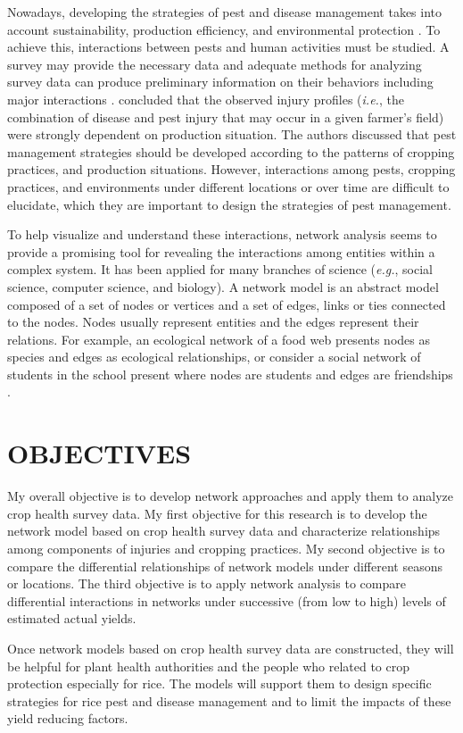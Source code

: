 Nowadays, developing the strategies of pest and disease management takes into account sustainability, production efficiency, and environmental protection \citep{Mew:2004kh}. To achieve this, interactions between pests and human activities must be studied. A survey may provide the necessary data and adequate methods for analyzing survey data can produce preliminary information on their behaviors including major interactions \citep{savary1995use}. \citet{Savary:2000vr} concluded that the observed injury profiles (\textit{i.e.}, the combination of disease and pest injury that may occur in a given farmer's field) were strongly dependent on production situation.  The authors discussed that pest management strategies should be developed according to the patterns of cropping practices, and production situations. However, interactions among pests, cropping practices, and environments under different locations or over time are difficult to elucidate, which they are important to design the strategies of pest management.

To help visualize and understand these interactions, network analysis seems to provide a promising tool for revealing the interactions among entities within a complex system. It has been applied for many branches of science (\textit{e.g.}, social science, computer science, and biology). A network model is an abstract model composed of a set of nodes or vertices and a set of edges, links or ties connected to the nodes. Nodes usually represent entities and the edges represent their relations. For example, an ecological network of a food web presents nodes as species \citep{krause2003compartments} and edges as ecological relationships, or consider a social network of students in the school present where nodes are students and edges are friendships \citep{moody2001race}.

\section*{OBJECTIVES}

My overall objective is to develop network approaches and apply them to analyze crop health survey data. My first objective for this research is to develop the network model based on crop health survey data and characterize relationships among components of injuries and cropping practices. My second objective is to compare the differential relationships of network models under different seasons or locations. The third objective is to apply network analysis to compare differential interactions in networks under successive (from low to high) levels of estimated actual yields.

Once network models based on crop health survey data are constructed, they will be helpful for plant health authorities and the people who related to crop protection especially for rice. The models will support them to design specific strategies for rice pest and disease management and to limit the impacts of these yield reducing factors.  

